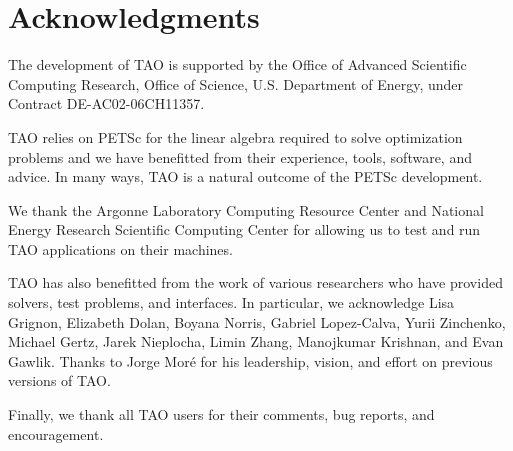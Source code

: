 %
%

\section*{Acknowledgments}

The development of TAO is supported by the Office of Advanced Scientific 
Computing Research, Office of Science, U.S. Department of Energy, under 
Contract DE-AC02-06CH11357.  

TAO relies on PETSc for the linear algebra required to solve optimization
problems and we have benefitted from their experience, tools, software, 
and advice. In many ways, TAO is a natural outcome of the PETSc development.

We thank the Argonne Laboratory Computing Resource Center and National
Energy Research Scientific Computing Center for allowing us to test and
run TAO applications on their machines.

%
TAO has also benefitted from the work of various researchers who have provided 
solvers, test problems, and interfaces.  In particular, we acknowledge Lisa 
Grignon, Elizabeth Dolan, Boyana Norris, Gabriel Lopez-Calva, Yurii Zinchenko, 
Michael Gertz, Jarek Nieplocha, Limin Zhang, Manojkumar Krishnan, and Evan 
Gawlik. Thanks to Jorge Mor\'e for his leadership, vision, and effort on 
previous versions of TAO.

Finally, we thank all TAO users for their comments, bug reports, and
encouragement.

